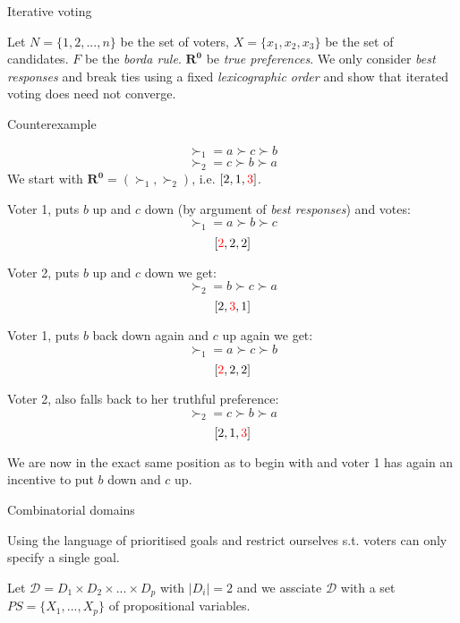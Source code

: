 \documentclass[12pt]{article}
\newenvironment{question}[2][Question]{\begin{trivlist}
\item[\hskip \labelsep {\bfseries #1}\hskip \labelsep {\bfseries #2.}]}{\end{trivlist}}
\newenvironment{answer}[2][Answer]{\begin{trivlist}
\item[\hskip \labelsep {\bfseries #1}\hskip \labelsep {\bfseries #2:}]}{\end{trivlist}}
\begin{document}
\begin{question}{2}{Iterative voting}

Let $N=\{1,2, ..., n\}$ be the set of voters, $X=\{x_1,x_2,x_3\}$ be the set of candidates. $F$ be the \textit{borda rule}. $\boldsymbol{R^0}$ be \textit{true preferences}. We only consider \textit{best responses} and break ties using a fixed \textit{lexicographic order} and show that iterated voting does need not converge.
\end{question}

\begin{answer}{a)}{Counterexample}

$$\succ_1=a\succ c\succ b$$
$$\succ_2=c\succ b\succ a$$
We start with $\boldsymbol{R^0}=(\succ_1,\succ_2)$, i.e. $[2,1,\textcolor{red}{3}]$.

Voter 1, puts $b$ up and $c$ down (by argument of \textit{best responses}) and votes:
$$\succ_1=a\succ b\succ c$$
$$[\textcolor{red}{2},2,2]$$

Voter 2, puts $b$ up and $c$ down we get:
$$\succ_2=b\succ c\succ a$$
$$[2,\textcolor{red}{3},1]$$

Voter 1, puts $b$ back down again and $c$ up again we get:
$$\succ_1=a\succ c\succ b$$
$$[\textcolor{red}{2},2,2]$$

Voter 2, also falls back to her truthful preference:
$$\succ_2=c\succ b\succ a$$
$$[2,1,\textcolor{red}{3}]$$

We are now in the exact same position as to begin with and voter 1 has again an incentive to put $b$ down and $c$ up.
\end{answer}

\begin{question}{3}{Combinatorial domains}

Using the language of prioritised goals and restrict ourselves s.t. voters can only specify a single goal.

Let $\mathcal{D}=D_1 \times D_2 \times ... \times D_p$ with $|D_i|=2$ and we assciate $\mathcal{D}$ with a set $PS=\{X_1, ..., X_p\}$ of propositional variables.
\end{question}
\end{document}
